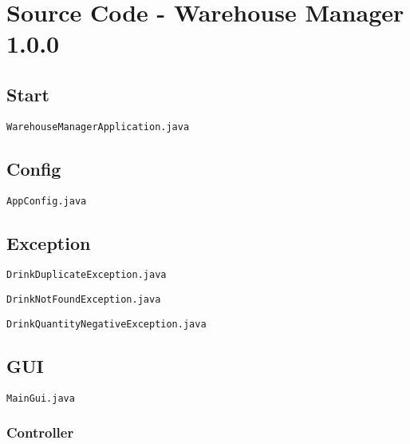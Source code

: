 \chapter{Source Code - Warehouse Manager 1.0.0}

\section{Start}

\verb|WarehouseManagerApplication.java|



\section{Config}

\verb|AppConfig.java|



\section{Exception}

\verb|DrinkDuplicateException.java|



\verb|DrinkNotFoundException.java|



\verb|DrinkQuantityNegativeException.java|



\section{GUI}

\verb|MainGui.java|



\subsection{Controller}

